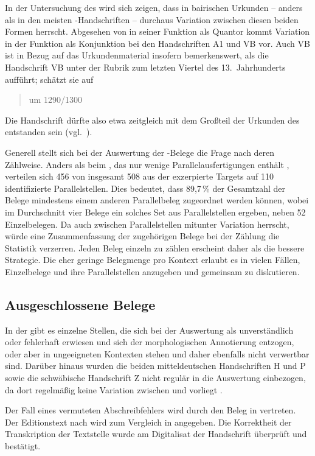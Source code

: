 In der Untersuchung des \CAO{} wird sich zeigen, dass in bairischen Urkunden --
anders als in den meisten \KC{}-Handschriften -- durchaus Variation zwischen
diesen beiden Formen herrscht. Abgesehen von  in seiner Funktion
als Quantor kommt Variation in der Funktion als Konjunktion bei den
Handschriften A1 und VB vor. Auch VB ist in Bezug auf das Urkundenmaterial
insofern bemerkenswert, als \citet[224]{schneider1987} die Handschrift VB unter
der Rubrik zum letzten Viertel des 13.~Jahrhunderts aufführt;
\citeauthor{wolf:kckat} schätzt sie auf \blockcquote[65]{wolf:kckat}{um
1290/1300}. Die Handschrift dürfte also etwa zeitgleich mit dem Großteil der
Urkunden des \CAO{} entstanden sein (vgl.~).

Generell stellt sich bei der Auswertung der \KC{}-Belege die Frage nach deren
Zählweise. Anders als beim \CAO{}, das nur wenige Parallelausfertigungen
enthält \autocite[vgl.][326--328]{ganslmayeretal2003}, verteilen sich 456 von
insgesamt 508 aus der \KC{} exzerpierte Targets auf 110 identifizierte
Parallelstellen. Dies bedeutet, dass 89,7\,\% der Gesamtzahl der Belege
mindestens einem anderen Parallelbeleg zugeordnet werden können, wobei im
Durchschnitt vier Belege ein solches Set aus Parallelstellen ergeben, neben 52
Einzelbelegen. Da auch zwischen Parallelstellen mitunter Variation herrscht,
würde eine Zusammenfassung der zugehörigen Belege bei der Zählung die Statistik
verzerren. Jeden Beleg einzeln zu zählen erscheint daher als die bessere
Strategie. Die eher geringe Belegmenge pro Kontext erlaubt es in vielen Fällen,
Einzelbelege und ihre Parallelstellen anzugeben und gemeinsam zu diskutieren.

\subsection{Ausgeschlossene Belege}
\label{subsec:ausgeschlossene_kc}

In der \KC{} gibt es einzelne Stellen, die sich bei der Auswertung als
unverständlich oder fehlerhaft erwiesen und sich der morphologischen
Annotierung entzogen, oder aber in ungeeigneten Kontexten stehen und daher
ebenfalls nicht verwertbar sind. Darüber hinaus wurden die beiden
mitteldeutschen Handschriften H und P sowie die schwäbische Handschrift Z nicht
regulär in die Auswertung einbezogen, da dort regelmäßig keine Variation
zwischen  und  vorliegt \autocite[vgl.
auch][183]{ksw2}.

Der Fall eines vermuteten Abschreibfehlers wird durch den Beleg in
 vertreten. Der Editionstext nach \citet{schroeder1895}
wird zum Vergleich in  angegeben. Die Korrektheit
der Transkription der Textstelle wurde am Digitalisat der Handschrift überprüft
und bestätigt.

